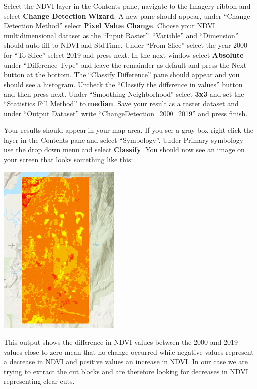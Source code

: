 \documentclass[
]{book}
\begin{document}
Select the NDVI layer in the Contents pane, navigate to the Imagery ribbon and select \textbf{Change Detection Wizard}. A new pane should appear, under ``Change Detection Method'' select \textbf{Pixel Value Change}. Choose your NDVI multidimensional dataset as the ``Input Raster''. ``Variable'' and ``Dimension'' should auto fill to NDVI and StdTime. Under ``From Slice'' select the year 2000 for ``To Slice'' select 2019 and press next. In the next window select \textbf{Absolute} under ``Difference Type'' and leave the remainder as default and press the Next button at the bottom. The ``Classify Difference'' pane should appear and you should see a histogram. Uncheck the ``Classify the difference in values'' button and then press next. Under ``Smoothing Neighborhood'' select \textbf{3x3} and set the ``Statistics Fill Method'' to \textbf{median}. Save your result as a raster dataset and under ``Output Dataset'' write ``ChangeDetection\_2000\_2019'' and press finish.

Your results should appear in your map area. If you see a gray box right click the layer in the Contents pane and select ``Symbology''. Under Primary symbology use the drop down menu and select \textbf{Classify}. You should now see an image on your screen that looks something like this:

\begin{center}\includegraphics[width=0.5\linewidth]{images/07-difference-in-ndvi} \end{center}

This output shows the difference in NDVI values between the 2000 and 2019 values close to zero mean that no change occurred while negative values represent a decrease in NDVI and positive values an increase in NDVI. In our case we are trying to extract the cut blocks and are therefore looking for decreases in NDVI representing clear-cuts.
\end{document}
